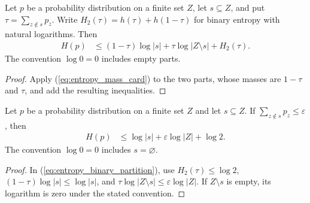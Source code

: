\begin{theorem}
    \label{thm:entropy_binary_partition}
    \leanok
    Let $p$ be a probability distribution on a finite set $Z$, let $s\subseteq Z$,
    and put $\tau=\sum_{z\notin s}p_z$.
    Write $H_2(\tau)=h(\tau)+h(1-\tau)$ for binary entropy with natural logarithms.
    Then
    \begin{align}
        \label{eq:entropy_binary_partition}
        H(p) & \le(1-\tau)\log|s|+\tau\log|Z\setminus s|+H_2(\tau).
    \end{align}
    The convention $\log0=0$ includes empty parts.
\end{theorem}
\begin{proof}\leanok
    Apply (\ref{eq:entropy_mass_card}) to the two parts, whose masses are
    $1-\tau$ and $\tau$, and add the resulting inequalities.
\end{proof}

\begin{theorem}
    \label{thm:entropy_concentration}
    \leanok
    Let $p$ be a probability distribution on a finite set $Z$ and let $s\subseteq Z$.
    If $\sum_{z\notin s}p_z\le\varepsilon$, then
    \begin{align}
        \label{eq:entropy_concentration}
        H(p) & \le\log|s|+\varepsilon\log|Z|+\log2.
    \end{align}
    The convention $\log0=0$ includes $s=\varnothing$.
\end{theorem}
\begin{proof}\leanok
    In (\ref{eq:entropy_binary_partition}), use $H_2(\tau)\le\log2$,
    $(1-\tau)\log|s|\le\log|s|$, and
    $\tau\log|Z\setminus s|\le\varepsilon\log|Z|$.
    If $Z\setminus s$ is empty, its logarithm is zero under the stated convention.
\end{proof}

